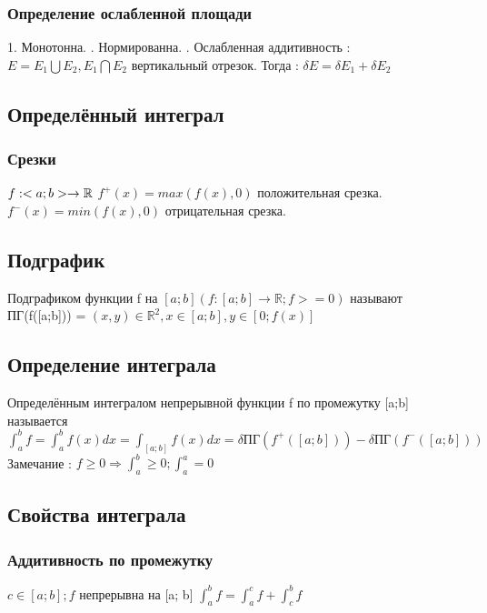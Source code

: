 \documentclass[12pt, a4paper]{article}
\newcommand{\nl}{\newline}
\begin{document}
        \subsubsection{Определение ослабленной площади}
        1. Монотонна. \nl
        2. Нормированна. \nl
        3. Ослабленная аддитивность : $E = E_1 \bigcup E_2, E_1 \bigcap E_2$ вертикальный отрезок.\nl 
        Тогда : $\delta E = \delta E_1 + \delta E_2$
        
        
    \subsection{Определённый интеграл}
        \subsubsection{Срезки}
        
        $f : <a; b> \rightarrow \mathbb{R} \nl$
        $f^+(x) = max(f(x), 0)$ положительная срезка. \nl
        $f^-(x) = min(f(x), 0)$ отрицательная срезка. \nl
        
        \subsection{Подграфик}
        Подграфиком функции f на $[a; b] (f : [a;b]\rightarrow \mathbb{R}; f>=0)$ называют \nl
        ПГ(f([a;b])) = {$(x, y) \in \mathbb{R}^2, x \in [a; b], y \in [0; f(x)]$}
        
        \subsection{Определение интеграла}
        Определённым интегралом непрерывной функции f по промежутку [a;b] называется \nl
        $\int^b_a f = \int^b_a f(x) dx = \int_{[a; b]} f(x) dx = \delta \text{ПГ}(f^+([a; b])) - \delta \text{ПГ}(f^-([a; b]))$ \nl
        Замечание : $f \geq 0 \Rightarrow \int^b_a \geq 0; \int^a_a = 0$
        
        \subsection{Свойства интеграла}
        \subsubsection{Аддитивность по промежутку}
        $c \in [a;b]; f$ непрерывна на [a; b] \nl
        $\int_a^b f = \int_a^c f + \int^b_c f$ \nl
\end{document}
